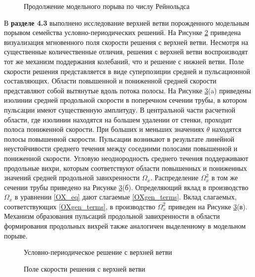 \begin{figure}
\caption{Продолжение модельного порыва по числу Рейнольдса}
\label{contin_pic}
\end{figure} 

В \textbf{разделе 4.3} выполнено исследование верхней ветви порожденного модельным порывом семейства условно-периодических решений. На Рисунке \ref{3D_ub_pic} приведена визуализация мгновенного поля скорости решения с верхней ветви. Несмотря на существенные количественные отличия, решения с верхней ветви воспроизводят тот же механизм поддержания колебаний, что и решение с нижней ветви. Поле скорости решения представляется в виде суперпозиции средней и пульсационной составляющих. Области повышенной и пониженной средней скорости представляют собой вытянутые вдоль потока полосы. На Рисунке \ref{ub_cs_pic}(a) приведены изолинии средней продольной скорости в поперечном сечении трубы, в котором пульсации имеют существенную амплитуду. В центральной части расчетной области, где изолинии находятся на большем удалении от стенки, проходит полоса пониженной скорости. При больших и меньших значениях $\theta$ находятся полосы повышенной скорости. Пульсации возникают в результате линейной неустойчивости среднего течения между соседними полосами повышенной и пониженной скорости. Угловую неоднородность среднего течения поддерживают продольные вихри, которым соответствуют области повышенных и пониженных значений средней продольной завихренности $\Omega_x$. Распределение $\Omega^2_x$ в том же сечении трубы приведено на Рисунке \ref{ub_cs_pic}(б). Определяющий вклад в производство $\Omega_x$ в уравнении \eqref{OX_eq} дают слагаемые \eqref{OXgen_terms}. Вклад слагаемых, соответствующих \eqref{OXgen_terms}, в производство $\Omega^2_x$ приведен на Рисунке \ref{ub_cs_pic}(в). Механизм образования пульсаций продольной завихренности в области формирования продольных вихрей также аналогичен выделенному в модельном порыве. 


\begin{figure}
\caption{Условно-периодическое решение с верхней ветви}
\label{3D_ub_pic}
\end{figure} 

\begin{figure}
\caption{Поле скорости решения с верхней ветви}
\label{ub_cs_pic}
\end{figure}

